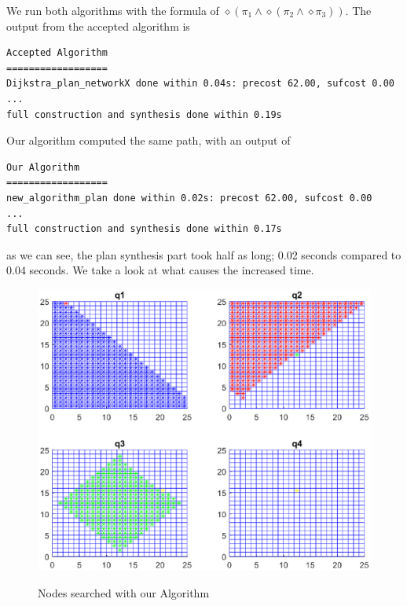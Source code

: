 We run both algorithms with the formula of $\diamond (\pi_1 \land \diamond(\pi_2 \land \diamond \pi_3))$. The output from the accepted algorithm is
\begingroup
\fontsize{9pt}{12pt}\selectfont
\begin{lstlisting}
Accepted Algorithm
==================
Dijkstra_plan_networkX done within 0.04s: precost 62.00, sufcost 0.00
...
full construction and synthesis done within 0.19s 
\end{lstlisting}
\endgroup
Our algorithm computed the same path, with an output of

\begin{lstlisting}
Our Algorithm
==================
new_algorithm_plan done within 0.02s: precost 62.00, sufcost 0.00
...
full construction and synthesis done within 0.17s 
\end{lstlisting}
as we can see, the plan synthesis part took half as long; 0.02 seconds compared to 0.04 seconds. We take a look at what causes the increased time. 

\begin{figure}[!htb]
\centering
\includegraphics[scale=0.9]{ourPlot}
\label{fig:animOur}
\caption{Nodes searched with our Algorithm}
\end{figure}

